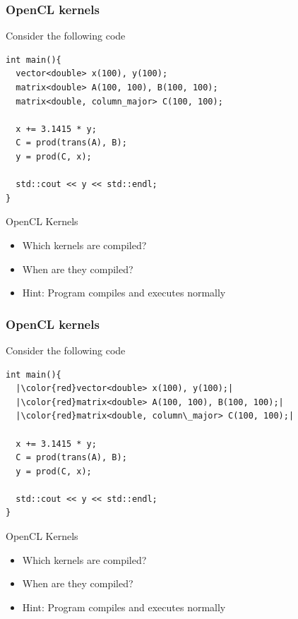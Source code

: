 \begin{frame}[fragile]
\frametitle{OpenCL kernels}

\begin{block}{Consider the following code}
  \begin{lstlisting}
int main(){
  vector<double> x(100), y(100);
  matrix<double> A(100, 100), B(100, 100);
  matrix<double, column_major> C(100, 100);

  x += 3.1415 * y;
  C = prod(trans(A), B);
  y = prod(C, x);

  std::cout << y << std::endl;
}
  \end{lstlisting}
\end{block}

\begin{block}{OpenCL Kernels}
  \begin{itemize}
    \item Which kernels are compiled?
    \item When are they compiled?
    \item Hint: Program compiles and executes normally
  \end{itemize}
\end{block}

\end{frame}


\begin{frame}[fragile]
\frametitle{OpenCL kernels}

\begin{block}{Consider the following code}
  \begin{lstlisting}
int main(){
  |\color{red}vector<double> x(100), y(100);|
  |\color{red}matrix<double> A(100, 100), B(100, 100);|
  |\color{red}matrix<double, column\_major> C(100, 100);|

  x += 3.1415 * y;
  C = prod(trans(A), B);
  y = prod(C, x);

  std::cout << y << std::endl;
}
  \end{lstlisting}
\end{block}

\begin{block}{OpenCL Kernels}
  \begin{itemize}
    \item Which kernels are compiled?
    \item When are they compiled?
    \item Hint: Program compiles and executes normally
  \end{itemize}
\end{block}

\end{frame}



